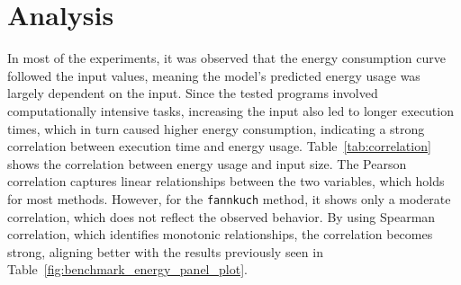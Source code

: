 \section{Analysis} \label{sec:analysis}



In most of the experiments, it was observed that the energy consumption curve followed the input values, meaning the model's predicted energy usage was largely dependent on the input. Since the tested programs involved computationally intensive tasks, increasing the input also led to longer execution times, which in turn caused higher energy consumption, indicating a strong correlation between execution time and energy usage. Table~\ref{tab:correlation} shows the correlation between energy usage and input size. The Pearson correlation captures linear relationships between the two variables, which holds for most methods. However, for the \texttt{fannkuch} method, it shows only a moderate correlation, which does not reflect the observed behavior. By using Spearman correlation, which identifies monotonic relationships, the correlation becomes strong, aligning better with the results previously seen in Table~\ref{fig:benchmark_energy_panel_plot}.


\begin{table}[htbp]
  \centering
  \footnotesize
  \setlength{\tabcolsep}{10pt} 
  \caption{Correlation between energy consumption and input. Pearson measures linear correlation, while Spearman captures monotonic (nonlinear) trends.}
  \label{tab:correlation}
\end{table}



